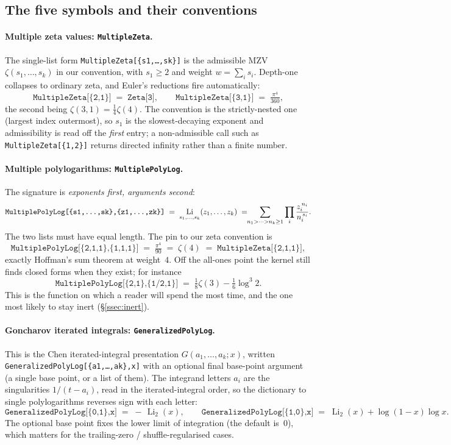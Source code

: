 \documentclass[11pt]{article}
\DeclareMathOperator{\Li}{Li}
\theoremstyle{plain}
\theoremstyle{remark}
\begin{document}
\subsection{The five symbols and their conventions}

\paragraph{Multiple zeta values: \texttt{MultipleZeta}.} The single-list form \texttt{MultipleZeta[\{s1,\dots,sk\}]} is the admissible MZV $\zeta(s_1,\dots,s_k)$ in our convention, with $s_1\ge 2$ and weight $w=\sum_i s_i$. Depth-one collapses to ordinary zeta, and Euler's reductions fire automatically:
\[
  \texttt{MultipleZeta[\{2,1\}]}\;=\;\texttt{Zeta[3]},\qquad
  \texttt{MultipleZeta[\{3,1\}]}\;=\;\tfrac{\pi^4}{360},
\]
the second being $\zeta(3,1)=\tfrac14\zeta(4)$. The convention is the strictly-nested one (largest index outermost), so $s_1$ is the slowest-decaying exponent and admissibility is read off the \emph{first} entry; a non-admissible call such as \texttt{MultipleZeta[\{1,2\}]} returns directed infinity rather than a finite number.

\paragraph{Multiple polylogarithms: \texttt{MultiplePolyLog}.} The signature is \emph{exponents first, arguments second}:
\[
  \texttt{MultiplePolyLog[\{s1,\dots,sk\},\{z1,\dots,zk\}]}\;=\;\Li_{s_1,\dots,s_k}(z_1,\dots,z_k)
  \;=\!\!\sum_{n_1>\dots>n_k\ge1}\prod_{i}\frac{z_i^{\,n_i}}{n_i^{\,s_i}}.
\]
The two lists must have equal length. The pin to our zeta convention is
\[
  \texttt{MultiplePolyLog[\{2,1,1\},\{1,1,1\}]}\;=\;\tfrac{\pi^4}{90}\;=\;\zeta(4)
  \;=\;\texttt{MultipleZeta[\{2,1,1\}]},
\]
exactly Hoffman's sum theorem at weight~$4$. Off the all-ones point the kernel still finds closed forms when they exist; for instance
\[
  \texttt{MultiplePolyLog[\{2,1\},\{1/2,1\}]}\;=\;\tfrac18\zeta(3)-\tfrac16\log^3 2 .
\]
This is the function on which a reader will spend the most time, and the one most likely to stay inert (\S\ref{ssec:inert}).

\paragraph{Goncharov iterated integrals: \texttt{GeneralizedPolyLog}.} This is the Chen iterated-integral presentation $G(a_1,\dots,a_k;x)$, written \texttt{GeneralizedPolyLog[\{a1,\dots,ak\},x]} with an optional final base-point argument (a single base point, or a list of them). The integrand letters $a_i$ are the singularities $1/(t-a_i)$, read in the iterated-integral order, so the dictionary to single polylogarithms reverses sign with each letter:
\[
  \texttt{GeneralizedPolyLog[\{0,1\},x]}\;=\;-\,\Li_2(x),\qquad
  \texttt{GeneralizedPolyLog[\{1,0\},x]}\;=\;\Li_2(x)+\log(1-x)\log x .
\]
The optional base point fixes the lower limit of integration (the default is~$0$), which matters for the trailing-zero / shuffle-regularised cases.
\end{document}

